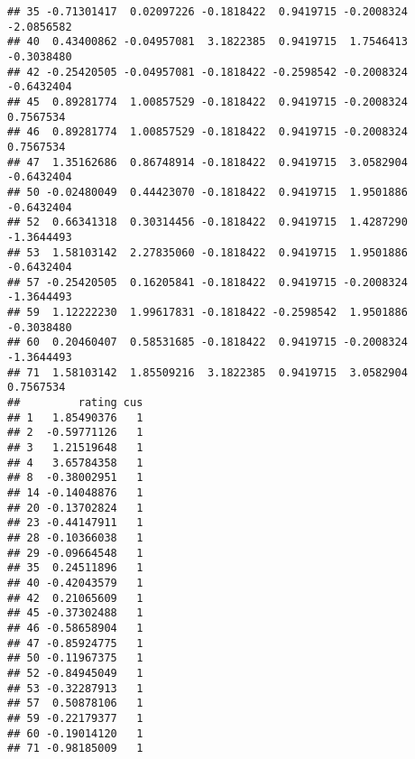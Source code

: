 \documentclass[
]{article}
\newenvironment{Shaded}{\begin{snugshade}}{\end{snugshade}}
\newcommand{\DecValTok}[1]{\textcolor[rgb]{0.00,0.00,0.81}{#1}}
\newcommand{\NormalTok}[1]{#1}
\newcommand{\SpecialCharTok}[1]{\textcolor[rgb]{0.00,0.00,0.00}{#1}}
\begin{document}
\begin{verbatim}
## 35 -0.71301417  0.02097226 -0.1818422  0.9419715 -0.2008324 -2.0856582
## 40  0.43400862 -0.04957081  3.1822385  0.9419715  1.7546413 -0.3038480
## 42 -0.25420505 -0.04957081 -0.1818422 -0.2598542 -0.2008324 -0.6432404
## 45  0.89281774  1.00857529 -0.1818422  0.9419715 -0.2008324  0.7567534
## 46  0.89281774  1.00857529 -0.1818422  0.9419715 -0.2008324  0.7567534
## 47  1.35162686  0.86748914 -0.1818422  0.9419715  3.0582904 -0.6432404
## 50 -0.02480049  0.44423070 -0.1818422  0.9419715  1.9501886 -0.6432404
## 52  0.66341318  0.30314456 -0.1818422  0.9419715  1.4287290 -1.3644493
## 53  1.58103142  2.27835060 -0.1818422  0.9419715  1.9501886 -0.6432404
## 57 -0.25420505  0.16205841 -0.1818422  0.9419715 -0.2008324 -1.3644493
## 59  1.12222230  1.99617831 -0.1818422 -0.2598542  1.9501886 -0.3038480
## 60  0.20460407  0.58531685 -0.1818422  0.9419715 -0.2008324 -1.3644493
## 71  1.58103142  1.85509216  3.1822385  0.9419715  3.0582904  0.7567534
##         rating cus
## 1   1.85490376   1
## 2  -0.59771126   1
## 3   1.21519648   1
## 4   3.65784358   1
## 8  -0.38002951   1
## 14 -0.14048876   1
## 20 -0.13702824   1
## 23 -0.44147911   1
## 28 -0.10366038   1
## 29 -0.09664548   1
## 35  0.24511896   1
## 40 -0.42043579   1
## 42  0.21065609   1
## 45 -0.37302488   1
## 46 -0.58658904   1
## 47 -0.85924775   1
## 50 -0.11967375   1
## 52 -0.84945049   1
## 53 -0.32287913   1
## 57  0.50878106   1
## 59 -0.22179377   1
## 60 -0.19014120   1
## 71 -0.98185009   1
\end{verbatim}

\begin{Shaded}
\end{Shaded}
\end{document}
